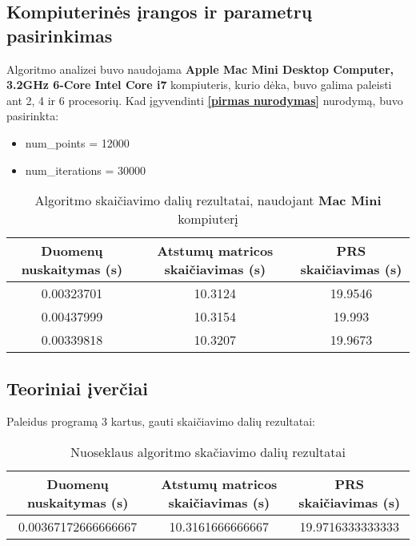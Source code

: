 \documentclass[a4paper,10pt]{article}
\begin{document}
\subsection{Kompiuterinės įrangos ir parametrų pasirinkimas}
Algoritmo analizei buvo naudojama \textbf{Apple Mac Mini Desktop Computer, 3.2GHz 6-Core Intel Core i7} kompiuteris, kurio dėka, buvo galima paleisti ant 2, 4 ir 6 procesorių.
Kad įgyvendinti \textbf{\ref{pirmas nurodymas}} nurodymą, buvo pasirinkta:
\begin{itemize}
	\item num\_points = 12000
	\item num\_iterations = 30000
\end{itemize}
\begin{table}[ht]
	\begin{center}
		\begin{tabular}{| c | c | c |}
			\hline
			Duomenų nuskaitymas (s) & Atstumų matricos skaičiavimas (s) & PRS skaičiavimas (s) \\
			\hline
			\num{0.00323701}        & \num{10.3124}                     & \num{19.9546}        \\
			\hline
			\num{0.00437999}        & \num{10.3154}                     & \num{19.993}         \\
			\hline
			\num{0.00339818}        & \num{10.3207}                     & \num{19.9673}        \\
			\hline
		\end{tabular}
	\end{center}
	\caption{Algoritmo skaičiavimo dalių rezultatai, naudojant \textbf{Mac Mini} kompiuterį}
\end{table}
\subsection{Teoriniai įverčiai}
Paleidus programą 3 kartus, gauti skaičiavimo dalių rezultatai:
\begin{table}[ht]
	\begin{center}
		\begin{tabular}{| c | c | c |}
			\hline
			Duomenų nuskaitymas (s)   & Atstumų matricos skaičiavimas (s) & PRS skaičiavimas (s)   \\
			\hline
			\num{0.00367172666666667} & \num{10.3161666666667}            & \num{19.9716333333333} \\
			\hline
		\end{tabular}
	\end{center}
	\caption{Nuoseklaus algoritmo skačiavimo dalių rezultatai}
\end{table}
\end{document}
